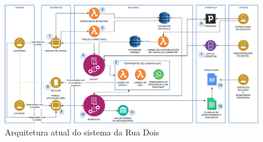 \begin{figure}[h]
  \centering
  \includegraphics[keepaspectratio=true,scale=0.3]{figuras/r2ArquiteturaAtual.eps}
  \caption{Arquitetura atual do sistema da Rua Dois}
  \label{fig:ArquiteturaAtual}
\end{figure}

